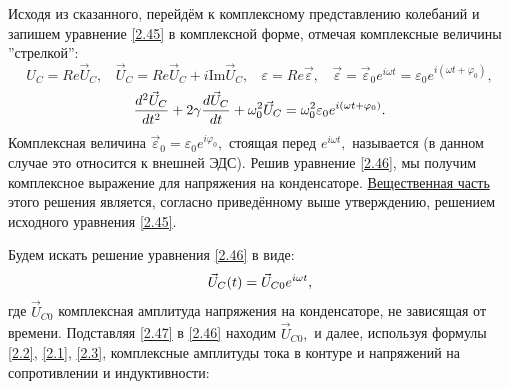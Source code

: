 Исходя из сказанного, перейдём к комплексному представлению колебаний и запишем уравнение \eqref{2.45} в комплексной форме, отмечая комплексные величины ''стрелкой'':
$$
U_C=Re\vec U_C,~~~~\vec U_C=Re\vec U_C+i\text{Im}\vec U_C,~~~~\varepsilon=Re\vec \varepsilon,~~~~\vec \varepsilon=\vec \varepsilon_0e^{i\omega t}=\varepsilon_0e^{i(\omega t+\varphi_0)},
$$
\begin{equation}\eqmark{2.46}
\dfrac{d^2\vec U_C}{dt^2}+2\gamma\dfrac{d\vec U_C}{dt}+\omega_0^2\vec U_C=\omega_0^2\varepsilon_0e^{i(\omega t+\varphi_0)}.
\end{equation}
Комплексная величина $\vec \varepsilon_0=\varepsilon_0e^{i\varphi_0},$ стоящая перед $e^{i\omega t},$ называется  (в данном случае это относится к внешней ЭДС). Решив уравнение \eqref{2.46}, мы получим комплексное выражение для напряжения на конденсаторе. \underline{Вещественная часть} этого решения является, согласно приведённому выше утверждению, решением исходного уравнения \eqref{2.45}.

Будем искать решение уравнения \eqref{2.46} в виде:
\begin{equation}\eqmark{2.47}
\vec U_C(t)=\vec U_{C0}e^{i\omega t},
\end{equation}
где $\vec U_{C0}$ \important{--} комплексная амплитуда напряжения на конденсаторе, не зависящая от времени. Подставляя \eqref{2.47} в \eqref{2.46} находим $\vec U_{C0},$ и далее, используя формулы \eqref{2.2}, \eqref{2.1}, \eqref{2.3}, \important{--} комплексные амплитуды тока в контуре и напряжений на сопротивлении и индуктивности:


